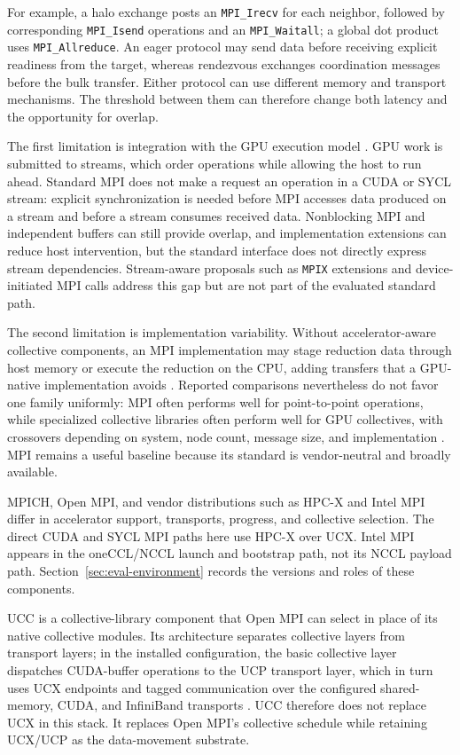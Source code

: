 For example, a halo exchange posts an \texttt{MPI\_Irecv} for each neighbor, followed by corresponding \texttt{MPI\_Isend} operations and an \texttt{MPI\_Waitall}; a global dot product uses \texttt{MPI\_Allreduce}. An eager protocol may send data before receiving explicit readiness from the target, whereas rendezvous exchanges coordination messages before the bulk transfer. Either protocol can use different memory and transport mechanisms. The threshold between them can therefore change both latency and the opportunity for overlap.

The first limitation is integration with the GPU execution model \cite{unat_landscape_2026}. GPU work is submitted to streams, which order operations while allowing the host to run ahead. Standard MPI does not make a request an operation in a CUDA or SYCL stream: explicit synchronization is needed before MPI accesses data produced on a stream and before a stream consumes received data. Nonblocking MPI and independent buffers can still provide overlap, and implementation extensions can reduce host intervention, but the standard interface does not directly express stream dependencies. Stream-aware proposals such as \texttt{MPIX} extensions and device-initiated MPI calls address this gap but are not part of the evaluated standard path.

The second limitation is implementation variability. Without accelerator-aware collective components, an MPI implementation may stage reduction data through host memory or execute the reduction on the CPU, adding transfers that a GPU-native implementation avoids \cite{unat_landscape_2026}. Reported comparisons nevertheless do not favor one family uniformly: MPI often performs well for point-to-point operations, while specialized collective libraries often perform well for GPU collectives, with crossovers depending on system, node count, message size, and implementation \cite{unat_landscape_2026}. MPI remains a useful baseline because its standard is vendor-neutral and broadly available.

MPICH, Open MPI, and vendor distributions such as HPC-X and Intel MPI differ in accelerator support, transports, progress, and collective selection. The direct CUDA and SYCL MPI paths here use HPC-X over UCX. Intel MPI appears in the oneCCL/NCCL launch and bootstrap path, not its NCCL payload path. Section~\ref{sec:eval-environment} records the versions and roles of these components.

UCC \cite{ucc_2025} is a collective-library component that Open MPI can select in place of its native collective modules. Its architecture separates collective layers from transport layers; in the installed configuration, the basic collective layer dispatches CUDA-buffer operations to the \ac{UCP} transport layer, which in turn uses UCX endpoints and tagged communication over the configured shared-memory, CUDA, and InfiniBand transports \cite{venkata_ucc_2024,openucx_ucc_source_2026}. UCC therefore does not replace UCX in this stack. It replaces Open MPI's collective schedule while retaining UCX/UCP as the data-movement substrate.

